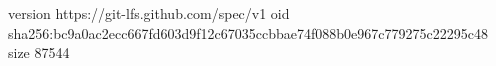 version https://git-lfs.github.com/spec/v1
oid sha256:bc9a0ac2ecc667fd603d9f12c67035ccbbae74f088b0e967c779275c22295c48
size 87544
